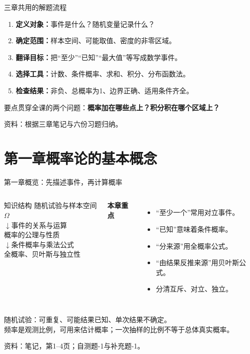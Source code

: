\documentclass[aspectratio=169,10pt]{beamer}
\newcommand{\source}[1]{\vfill{\color{Muted}\fontsize{6.5}{8}\selectfont 资料：#1\par}}
\newcommand{\key}[1]{\begin{block}{要点}#1\end{block}}
\begin{document}
\begin{frame}[t]{三章共用的解题流程}
\begin{enumerate}
\item \textbf{定义对象：}事件是什么？随机变量记录什么？
\item \textbf{确定范围：}样本空间、可能取值、密度的非零区域。
\item \textbf{翻译目标：}把“至少”“已知”“最大值”等写成数学事件。
\item \textbf{选择工具：}计数、条件概率、求和、积分、分布函数法。
\item \textbf{检查结果：}非负、总概率为1、边界正确、适用条件齐全。
\end{enumerate}
\key{贯穿全课的两个问题：\quad\textbf{概率加在哪些点上？积分积在哪个区域上？}}
\source{根据三章笔记与六份习题归纳。}
\end{frame}

\section{第一章\quad 概率论的基本概念}
\begin{frame}[t]{第一章概览：先描述事件，再计算概率}
\begin{columns}[T]
\begin{block}{知识结构}
随机试验与样本空间$\Omega$\\[2mm]
$\downarrow$\quad 事件的关系与运算\\[2mm]
概率的公理与性质\\[2mm]
$\downarrow$\quad 条件概率与乘法公式\\[2mm]
全概率、贝叶斯与独立性
\end{block}
\textbf{本章重点}
\begin{itemize}
\item “至少一个”常用对立事件。
\item “已知”意味着条件概率。
\item “分来源”用全概率公式。
\item “由结果反推来源”用贝叶斯公式。
\item 分清互斥、对立、独立。
\end{itemize}
\end{columns}
{\small 随机试验：可重复、可能结果已知、单次结果不确定。\\
频率是观测比例，可用来估计概率；一次抽样的比例不等于总体真实概率。}
\source{笔记，第1--4页；自测题-1与补充题-1。}
\end{frame}
\end{document}
